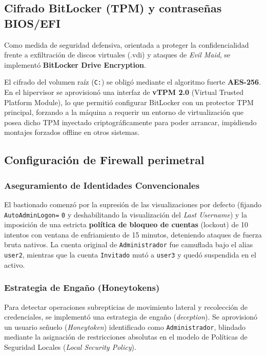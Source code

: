 \subsection[Cifrado BitLocker y BIOS/EFI]{Cifrado BitLocker (TPM) y contraseñas BIOS/EFI}
\label{subsec:cifrado_bitlocker}
Como medida de seguridad defensiva, orientada a proteger la confidencialidad frente a exfiltración de discos virtuales (.vdi) y ataques de \textit{Evil Maid}, se implementó \textbf{BitLocker Drive Encryption}.

El cifrado del volumen raíz (\texttt{C:}) se obligó mediante el algoritmo fuerte \textbf{AES-256}. En el hipervisor se aprovisionó una interfaz de \textbf{vTPM 2.0} (Virtual Trusted Platform Module), lo que permitió configurar BitLocker con un protector TPM principal, forzando a la máquina a requerir un entorno de virtualización que posea dicho TPM inyectado criptográficamente para poder arrancar, impidiendo montajes forzados offline en otros sistemas.

\subsection[Configuración de Firewall Perimetral]{Configuración de Firewall perimetral}
\label{subsec:configuracion_firewall}

\subsubsection{Aseguramiento de Identidades Convencionales}
El bastionado comenzó por la supresión de las visualizaciones por defecto (fijando \texttt{Auto}\allowbreak\texttt{Admin}\allowbreak\texttt{Logon=} \texttt{0} y deshabilitando la visualización del \textit{Last Username}) y la imposición de una estricta \textbf{política de bloqueo de cuentas} (lockout) de 10 intentos con ventana de enfriamiento de 15 minutos, deteniendo ataques de fuerza bruta nativos. La cuenta original de \texttt{Adminis}\allowbreak\texttt{trador} fue camuflada bajo el alias \texttt{user2}, mientras que la cuenta \texttt{Invitado} mutó a \texttt{user3} y quedó suspendida en el activo.

\subsubsection{Estrategia de Engaño (Honeytokens)}
Para detectar operaciones subrepticias de movimiento lateral y recolección de credenciales, se implementó una estrategia de engaño (\textit{deception}). Se aprovisionó un usuario señuelo (\textit{Honeytoken}) identificado como \texttt{Administrador}, blindado mediante la asignación de restricciones absolutas en el modelo de Políticas de Seguridad Locales (\textit{Local Security Policy}). 

